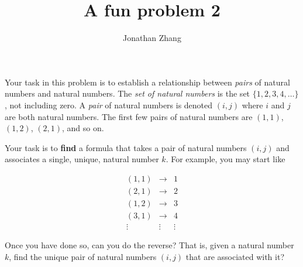 \documentclass[letterpaper,twoside,11pt]{article}
\theoremstyle{mystyle}
\begin{document}
\title{\vspace{-2\baselineskip} 
A fun problem 2
}
\author{Jonathan Zhang  }
\date{}
\maketitle

Your task in this problem is to establish a relationship between \textit{pairs} of natural numbers and natural numbers.
The \textit{set of natural numbers} is the set $\{1, 2, 3, 4, \dots\}$, not including zero. 
A \textit{pair} of natural numbers is denoted $(i, j)$ where $i$ and $j$ are both natural numbers. The first few pairs of natural numbers are $(1, 1)$, $(1, 2)$, $(2, 1)$, and so on. 

Your task is to \textbf{find} a formula that takes a pair of natural numbers $(i,j)$ and associates a single, unique, natural number $k$. For example, you may start like 

\[\begin{array}{*{20}{c}}
  {\left( {1,1} \right)}& \to &1 \\ 
  {\left( {2,1} \right)}& \to &2 \\ 
  {\left( {1,2} \right)}& \to &3 \\ 
  {\left( {3,1} \right)}& \to &4 \\ 
   \vdots & \vdots & \vdots  
\end{array}\]

Once you have done so, can you do the reverse? That is, given a natural number $k$, find the unique pair of natural numbers $\left( i,j \right)$ that are associated with it? 
\end{document}
